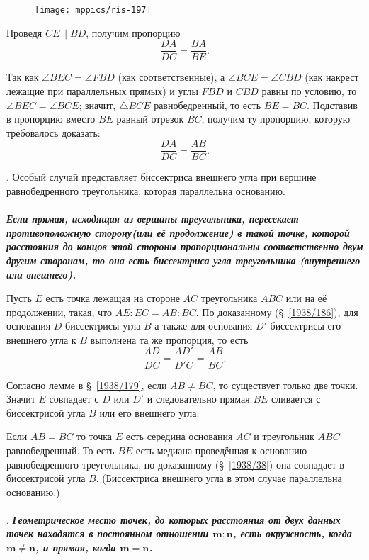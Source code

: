 \documentclass[twoside]{book}
\begin{document}
\begin{figure}
\centering
\texttt{[image: mppics/ris-197]}
\caption{}\label{1938/ris-197}
\end{figure}

Проведя $CE \parallel BD$, получим пропорцию
\[\frac{DA}{DC}=\frac{BA}{BE}.\]

Так как $\angle BEC=\angle FBD$ (как соответственные), а $\angle BCE=\angle CBD$ (как накрест лежащие при параллельных прямых) и углы $FBD$ и $CBD$ равны по условию, то $\angle BEC=\angle BCE$;
значит, $\triangle BCE$ равнобедренный, то есть $BE=BC$.
Подставив в пропорцию вместо $BE$ равный отрезок $BC$, получим ту пропорцию, которую требовалось доказать:
\[\frac{DA}{DC}=\frac{AB}{BC}.\]

\smallskip
{}.
Особый случай представляет биссектриса внешнего угла при вершине равнобедренного треугольника, которая параллельна основанию.

\paragraph{}\label{1914/227}
\textbf{\emph{Если прямая, исходящая из вершины треугольника, пересекает противоположную сторону(или её продолжение) в такой точке, которой расстояния до концов этой стороны пропорциональны соответственно двум другим сторонам, то она есть биссектриса угла треугольника (внутреннего или внешнего).}}

Пусть  $E$ есть точка лежащая на стороне $AC$ треугольника $ABC$ или на её продолжении, такая, что
$AE:EC=AB:BC$.
По доказанному (§~\ref{1938/186}), для основания $D$ биссектрисы угла $B$ а также для основания $D'$ биссектрисы его внешнего угла к $B$ выполнена та же пропорция, то есть
\[\frac{AD}{DC}=\frac{AD'}{D'C}=\frac{AB}{BC}.\]

Согласно лемме в §~\ref{1938/179}, если $AB\ne BC$, то существует только две точки.
Значит $E$ совпадает с $D$ или $D'$ и следовательно прямая $BE$ сливается с биссектрисой угла $B$ или его внешнего угла.

Если $AB=BC$ то точка $E$ есть середина основания $AC$ и треугольник $ABC$ равнобедренный. 
То есть $BE$ есть медиана проведённая к основанию равнобедренного треугольника,
по доказанному (§~\ref{1938/38}) она совпадает в биссектрисой угла $B$.
(Биссектриса внешнего угла в этом случае параллельна основанию.)


\paragraph{}\label{1914/228}
.
\textbf{\emph{Геометрическое место точек, до которых расстояния от двух данных точек находятся в постоянном отношении $\bm{m:n}$, есть окружность, когда $\bm{m\ne n}$, и прямая, когда $\bm{m=n}$.}}
\end{document}

